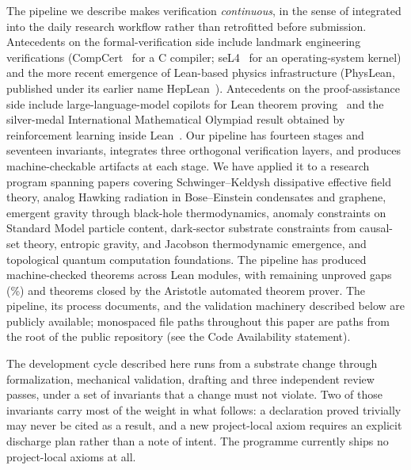 \documentclass[11pt]{article}
\begin{document}
The pipeline we describe makes verification \emph{continuous}, in
the sense of integrated into the daily research workflow rather
than retrofitted before submission. Antecedents on the
formal-verification side include landmark engineering verifications
(CompCert~\cite{compcert} for a C compiler; seL4~\cite{sel4} for an
operating-system kernel) and the more recent emergence of
Lean-based physics infrastructure (PhysLean, published under its
earlier name HepLean~\cite{TooBySmithHepLean}). Antecedents on the
proof-assistance side include large-language-model copilots for
Lean theorem proving~\cite{leancipilot} and the silver-medal
International Mathematical Olympiad result obtained by reinforcement
learning inside Lean~\cite{AlphaProof2025}.
Our pipeline has fourteen stages and seventeen invariants, integrates
three orthogonal verification layers, and produces
machine-checkable artifacts at each stage. We have applied it to
a research program spanning \papercount{}
papers covering Schwinger--Keldysh dissipative effective field
theory, analog Hawking radiation in Bose--Einstein condensates and
graphene, emergent gravity through black-hole thermodynamics,
anomaly constraints on Standard Model particle content, dark-sector
substrate constraints from causal-set theory, entropic gravity, and
Jacobson thermodynamic emergence, and topological quantum
computation foundations. The pipeline has produced
\totaltheorems{} machine-checked theorems across \leanmodules{}
Lean modules, with \sorrycount{} remaining unproved gaps
(\sorrypercent\%) and \aristotleproved{} theorems closed by the
Aristotle automated theorem prover. The pipeline, its process
documents, and the validation machinery described below are
publicly available; monospaced file paths throughout this paper
are paths from the root of the public repository (see the Code
Availability statement).

The development cycle described here runs from a substrate change
through formalization, mechanical validation, drafting and three
independent review passes, under a set of invariants that a change
must not violate. Two of those invariants carry most of the weight in
what follows: a declaration proved trivially may never be cited as a
result, and a new project-local axiom requires an explicit discharge
plan rather than a note of intent. The programme currently ships no
project-local axioms at all.
\end{document}
